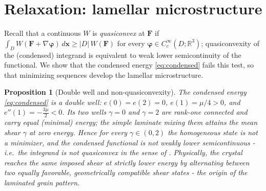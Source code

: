\documentclass[12pt]{article}
\theoremstyle{plain}
\newtheorem{proposition}[theorem]{Proposition}
\theoremstyle{definition}
\newcommand{\bF}{\bm{F}}
\newcommand{\bx}{\bm{x}}
\newcommand{\R}{\mathbb{R}}
\begin{document}
\section{Relaxation: lamellar microstructure}\label{sec:relax}
Recall \citep[see][]{dacorogna2008direct} that a continuous $W$ is \emph{quasiconvex} at $\bF$ if
$\int_{D}W(\bF+\nabla\bm\varphi)\,d\bx\ge|D|\,W(\bF)$ for every
$\bm\varphi\in C^{\infty}_{c}(D;\R^{3})$; quasiconvexity of the (condensed)
integrand is equivalent to weak lower semicontinuity of the functional. We show
that the condensed energy \eqref{eq:condensed} fails this test, so that
minimizing sequences develop the lamellar microstructure.

\begin{proposition}[Double well and non-quasiconvexity]\label{prop:nonqc}
The condensed energy \eqref{eq:condensed} is a double well: $e(0)=e(2)=0$,
$e(1)=\mu/4>0$, and $e''(1)=-\tfrac{3\mu}{2}<0$. Its two wells $\gamma=0$ and
$\gamma=2$ are rank-one connected and carry equal (minimal) energy; the simple
laminate mixing them attains the mean shear $\gamma$ at zero energy. Hence for
every $\gamma\in(0,2)$ the homogeneous state is not a minimizer, and the
condensed functional is not weakly lower semicontinuous - i.e.\ the integrand
is not quasiconvex in the sense of \citet{dacorogna2008direct}. Physically, the crystal
reaches the same imposed shear at strictly lower energy by alternating between two
equally favorable, geometrically compatible shear states - the origin of the
laminated grain pattern.
\end{proposition}
\end{document}

